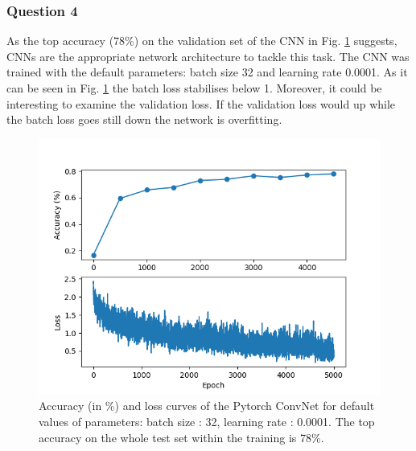 \documentclass{article}
\begin{document}
\subsubsection*{Question 4}
As the top accuracy (78\%) on the validation set of the CNN in Fig. \ref{convnet} suggests, CNNs are the appropriate network architecture to tackle this task. The CNN was trained with the default parameters: batch size 32 and learning rate 0.0001. As it can be seen in Fig. \ref{convnet} the batch loss stabilises below 1. Moreover, it could be interesting to examine the validation loss. If the validation loss would up while the batch loss goes still down the network is overfitting.
\begin{figure}[h!]
    \centering
  \centering
  \includegraphics[scale=0.5]{convnet.png}
  \caption{Accuracy (in \%) and loss curves of the Pytorch ConvNet for default values of parameters: batch size : 32, learning rate : 0.0001. The top accuracy on the whole test set within the training is 78\%.}
  \label{convnet}
\end{figure}
\end{document}
